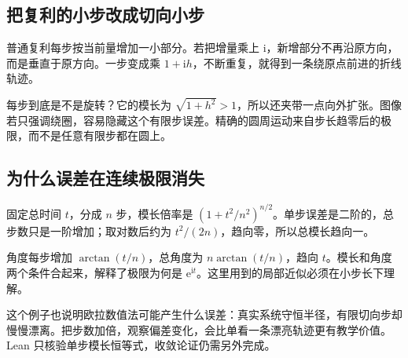 \subsection*{把复利的小步改成切向小步}
普通复利每步按当前量增加一小部分。若把增量乘上 $\mathrm i$，新增部分不再沿原方向，而是垂直于原方向。一步变成乘 $1+\mathrm i h$，不断重复，就得到一条绕原点前进的折线轨迹。

每步到底是不是旋转？它的模长为 $\sqrt{1+h^2}>1$，所以还夹带一点向外扩张。图像若只强调绕圈，容易隐藏这个有限步误差。精确的圆周运动来自步长趋零后的极限，而不是任意有限步都在圆上。

\subsection*{为什么误差在连续极限消失}
固定总时间 $t$，分成 $n$ 步，模长倍率是 $(1+t^2/n^2)^{n/2}$。单步误差是二阶的，总步数只是一阶增加；取对数后约为 $t^2/(2n)$，趋向零，所以总模长趋向一。

角度每步增加 $\arctan(t/n)$，总角度为 $n\arctan(t/n)$，趋向 $t$。模长和角度两个条件合起来，解释了极限为何是 $\mathrm e^{\mathrm it}$。这里用到的局部近似必须在小步长下理解。

这个例子也说明欧拉数值法可能产生什么误差：真实系统守恒半径，有限切向步却慢慢漂离。把步数加倍，观察偏差变化，会比单看一条漂亮轨迹更有教学价值。Lean 只核验单步模长恒等式，收敛论证仍需另外完成。
